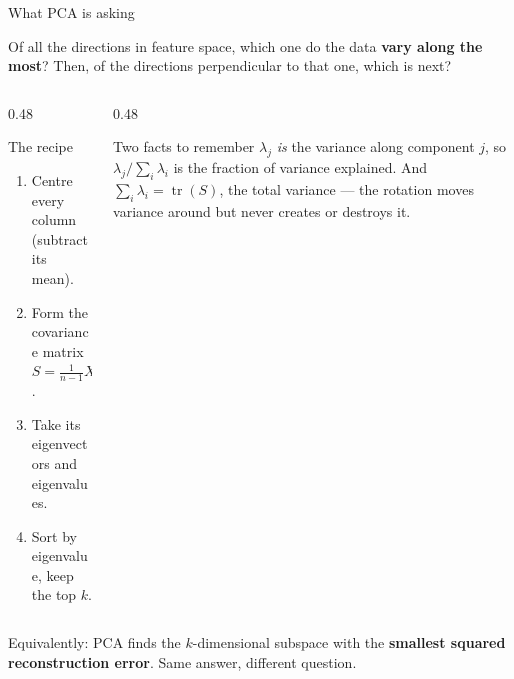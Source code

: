 \documentclass[aspectratio=169]{beamer}
\begin{document}
\begin{frame}[shrink=6]{What PCA is asking}
  \begin{exampleblock}{}
    \centering
    Of all the directions in feature space, which one do the data
    \textbf{vary along the most}? Then, of the directions perpendicular to
    that one, which is next?
  \end{exampleblock}
  \vspace{0.3em}
  \begin{columns}[T]
    \begin{column}{0.48\textwidth}
      \begin{block}{The recipe}
        \begin{enumerate}\small
          \item Centre every column (subtract its mean).
          \item Form the covariance matrix
            $S = \frac{1}{n-1} X_c^{\!\top} X_c$.
          \item Take its eigenvectors and eigenvalues.
          \item Sort by eigenvalue, keep the top $k$.
        \end{enumerate}
      \end{block}
    \end{column}
    \begin{column}{0.48\textwidth}
      \begin{block}{Two facts to remember}
        \small $\lambda_j$ \emph{is} the variance along component $j$, so
        $\lambda_j / \sum_i \lambda_i$ is the fraction of variance explained.
        And $\sum_i \lambda_i = \operatorname{tr}(S)$, the total variance ---
        the rotation moves variance around but never creates or destroys it.
      \end{block}
    \end{column}
  \end{columns}
  \vspace{0.2em}
  \begin{center}\small
    Equivalently: PCA finds the $k$-dimensional subspace with the
    \textbf{smallest squared reconstruction error}. Same answer, different
    question.
  \end{center}
\end{frame}
\end{document}
